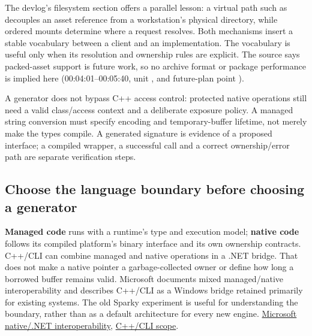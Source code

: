 The devlog's filesystem section offers a parallel lesson: a virtual path such as  decouples an asset reference from a workstation's physical directory, while ordered mounts determine where a request resolves. Both mechanisms insert a stable vocabulary between a client and an implementation. The vocabulary is useful only when its resolution and ownership rules are explicit. The source says packed-asset support is future work, so no archive format or package performance is implied here (00:04:01--00:05:40, unit , and future-plan point ).

A generator does not bypass C++ access control: protected native operations still need a valid class/access context and a deliberate exposure policy. A managed string conversion must specify encoding and temporary-buffer lifetime, not merely make the types compile. A generated signature is evidence of a proposed interface; a compiled wrapper, a successful call and a correct ownership/error path are separate verification steps.

\subsection{Choose the language boundary before choosing a generator}\label{01-foundations-i-ch016-choose-the-language-boundary-before-choosing-a-generator}

\hypertarget{01-foundations-i-ch016-choose-the-language-boundary-before-choosing-a-generator}{}

\textbf{Managed code} runs with a runtime's type and execution model; \textbf{native code} follows its compiled platform's binary interface and its own ownership contracts. C++/CLI can combine managed and native operations in a .NET bridge. That does not make a native pointer a garbage-collected owner or define how long a borrowed buffer remains valid. Microsoft documents mixed managed/native interoperability and describes C++/CLI as a Windows bridge retained primarily for existing systems. The old Sparky experiment is useful for understanding the boundary, rather than as a default architecture for every new engine. \href{https://learn.microsoft.com/en-us/cpp/dotnet/native-and-dotnet-interoperability}{Microsoft native/.NET interoperability}, \href{https://learn.microsoft.com/en-us/cpp/dotnet/}{C++/CLI scope}.

